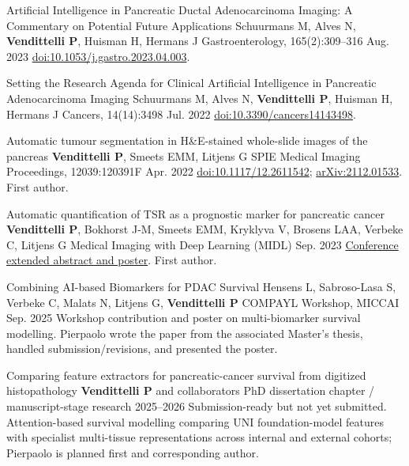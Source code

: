 \canonicalpublication
  {Artificial Intelligence in Pancreatic Ductal Adenocarcinoma Imaging: A Commentary on Potential Future Applications}
  {Schuurmans M, Alves N, \textbf{Vendittelli P}, Huisman H, Hermans J}
  {Gastroenterology, 165(2):309--316}
  {Aug. 2023}
  {\href{https://doi.org/10.1053/j.gastro.2023.04.003}{doi:10.1053/j.gastro.2023.04.003}.}

\canonicalpublication
  {Setting the Research Agenda for Clinical Artificial Intelligence in Pancreatic Adenocarcinoma Imaging}
  {Schuurmans M, Alves N, \textbf{Vendittelli P}, Huisman H, Hermans J}
  {Cancers, 14(14):3498}
  {Jul. 2022}
  {\href{https://doi.org/10.3390/cancers14143498}{doi:10.3390/cancers14143498}.}

\canonicalpublication
  {Automatic tumour segmentation in H\&E-stained whole-slide images of the pancreas}
  {\textbf{Vendittelli P}, Smeets EMM, Litjens G}
  {SPIE Medical Imaging Proceedings, 12039:120391F}
  {Apr. 2022}
  {\href{https://doi.org/10.1117/12.2611542}{doi:10.1117/12.2611542}; \href{https://arxiv.org/abs/2112.01533}{arXiv:2112.01533}. First author.}

\canonicalpublication
  {Automatic quantification of TSR as a prognostic marker for pancreatic cancer}
  {\textbf{Vendittelli P}, Bokhorst J-M, Smeets EMM, Kryklyva V, Brosens LAA, Verbeke C, Litjens G}
  {Medical Imaging with Deep Learning (MIDL)}
  {Sep. 2023}
  {\href{https://openreview.net/pdf?id=Dtz_iaUpGc}{Conference extended abstract and poster}. First author.}


\canonicalpublication
  {Combining AI-based Biomarkers for PDAC Survival}
  {Hensens L, Sabroso-Lasa S, Verbeke C, Malats N, Litjens G, \textbf{Vendittelli P}}
  {COMPAYL Workshop, MICCAI}
  {Sep. 2025}
  {Workshop contribution and poster on multi-biomarker survival modelling. Pierpaolo wrote the paper from the associated Master's thesis, handled submission/revisions, and presented the poster.}

\canonicalpublication
  {Comparing feature extractors for pancreatic-cancer survival from digitized histopathology}
  {\textbf{Vendittelli P} and collaborators}
  {PhD dissertation chapter / manuscript-stage research}
  {2025--2026}
  {Submission-ready but not yet submitted. Attention-based survival modelling comparing UNI foundation-model features with specialist multi-tissue representations across internal and external cohorts; Pierpaolo is planned first and corresponding author.}
